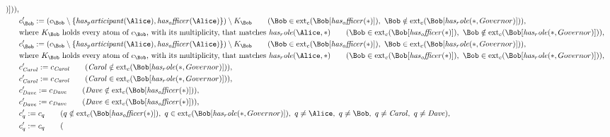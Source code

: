 \begin{align*}
)
]
)
)
,\\
&
c'_
{
\Bob
}
 := 
(c_
{
\Bob
}
 \setminus 
\{
\mathit{
has_participant
}
(
\Alice
)
,
\mathit{
has_officer
}
(
\Alice
)
\}
) \setminus K_
{
\Bob
}
 \qquad (
\Bob
 \in 
\mathrm{ext}_c(
\Bob
[
\mathit{
has_officer
}
(
\ast
)
]
)
,\ 
\Bob
 \notin 
\mathrm{ext}_c(
\Bob
[
\mathit{
has_role
}
(
\ast
,
Governor
)
]
)
)
,\\
&
\text{where } K_
{
\Bob
}
 \text{ holds every atom of } c_
{
\Bob
}
 \text{, with its multiplicity, that matches } 
\mathit{
has_role
}
(
\Alice
,
\ast
)
 \qquad (
\Bob
 \in 
\mathrm{ext}_c(
\Bob
[
\mathit{
has_officer
}
(
\ast
)
]
)
,\ 
\Bob
 \notin 
\mathrm{ext}_c(
\Bob
[
\mathit{
has_role
}
(
\ast
,
Governor
)
]
)
)
,\\
&
c'_
{
\Bob
}
 := 
(c_
{
\Bob
}
 \setminus 
\{
\mathit{
has_participant
}
(
\Alice
)
,
\mathit{
has_officer
}
(
\Alice
)
\}
) \setminus K_
{
\Bob
}
 \qquad (
\Bob
 \in 
\mathrm{ext}_c(
\Bob
[
\mathit{
has_officer
}
(
\ast
)
]
)
,\ 
\Bob
 \in 
\mathrm{ext}_c(
\Bob
[
\mathit{
has_role
}
(
\ast
,
Governor
)
]
)
)
,\\
&
\text{where } K_
{
\Bob
}
 \text{ holds every atom of } c_
{
\Bob
}
 \text{, with its multiplicity, that matches } 
\mathit{
has_role
}
(
\Alice
,
\ast
)
 \qquad (
\Bob
 \in 
\mathrm{ext}_c(
\Bob
[
\mathit{
has_officer
}
(
\ast
)
]
)
,\ 
\Bob
 \in 
\mathrm{ext}_c(
\Bob
[
\mathit{
has_role
}
(
\ast
,
Governor
)
]
)
)
,\\
&
c'_
{
\mathit{Carol}
}
 := 
c_
{
\mathit{Carol}
}
 \qquad (
\mathit{Carol}
 \notin 
\mathrm{ext}_c(
\Bob
[
\mathit{
has_role
}
(
\ast
,
Governor
)
]
)
)
,\\
&
c'_
{
\mathit{Carol}
}
 := 
c_
{
\mathit{Carol}
}
 \qquad (
\mathit{Carol}
 \in 
\mathrm{ext}_c(
\Bob
[
\mathit{
has_role
}
(
\ast
,
Governor
)
]
)
)
,\\
&
c'_
{
\mathit{Dave}
}
 := 
c_
{
\mathit{Dave}
}
 \qquad (
\mathit{Dave}
 \notin 
\mathrm{ext}_c(
\Bob
[
\mathit{
has_officer
}
(
\ast
)
]
)
)
,\\
&
c'_
{
\mathit{Dave}
}
 := 
c_
{
\mathit{Dave}
}
 \qquad (
\mathit{Dave}
 \in 
\mathrm{ext}_c(
\Bob
[
\mathit{
has_officer
}
(
\ast
)
]
)
)
,\\
&
c'_
q
 := 
c_
q
 \qquad (
q
 \notin 
\mathrm{ext}_c(
\Bob
[
\mathit{
has_officer
}
(
\ast
)
]
)
,\ 
q
 \in 
\mathrm{ext}_c(
\Bob
[
\mathit{
has_role
}
(
\ast
,
Governor
)
]
)
,\ 
q \neq 
\Alice
,\ 
q \neq 
\Bob
,\ 
q \neq 
\mathit{Carol}
,\ 
q \neq 
\mathit{Dave}
)
,\\
&
c'_
q
 := 
c_
q
 \qquad (

\end{align*}
